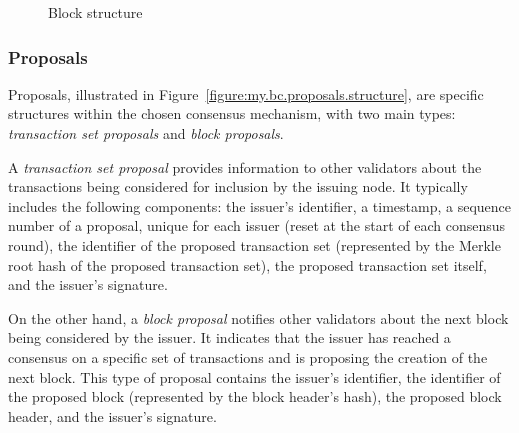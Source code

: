 \begin{figure}[h]
    \begin{center}
    \end{center}
    \caption{Block structure}
    \label{figure:my.bc.block.structure}
\end{figure}

\subsubsection{Proposals}

Proposals, illustrated in Figure~\ref{figure:my.bc.proposals.structure}, are specific structures within the chosen consensus mechanism, with two main types: \emph{transaction set proposals} and \emph{block proposals}.

A \emph{transaction set proposal} provides information to other validators about the transactions being considered for inclusion by the issuing node. It typically includes the following components: the issuer's identifier, a timestamp, a sequence number of a proposal, unique for each issuer (reset at the start of each consensus round), the identifier of the proposed transaction set (represented by the Merkle root hash of the proposed transaction set), the proposed transaction set itself, and the issuer's signature.

On the other hand, a \emph{block proposal} notifies other validators about the next block being considered by the issuer. It indicates that the issuer has reached a consensus on a specific set of transactions and is proposing the creation of the next block. This type of proposal contains the issuer's identifier, the identifier of the proposed block (represented by the block header's hash), the proposed block header, and the issuer's signature.

